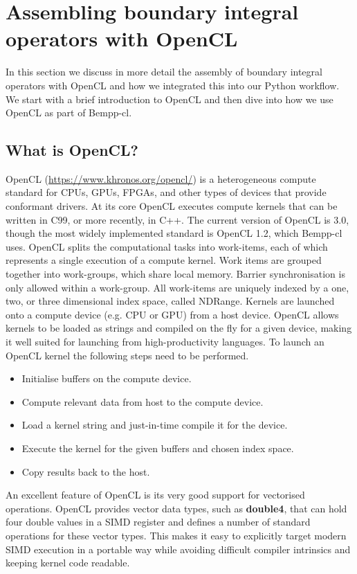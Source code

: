 \section{Assembling boundary integral operators with OpenCL}

In this section we discuss in more detail the assembly of boundary integral operators with OpenCL
and how we integrated this into our Python workflow. We start with a brief introduction to OpenCL and then
dive into how we use OpenCL as part of Bempp-cl.

\subsection{What is OpenCL?}

OpenCL (\url{https://www.khronos.org/opencl/}) is a heterogeneous compute standard for CPUs, GPUs, FPGAs, and other types of devices that provide conformant drivers. At its core OpenCL executes compute kernels that can be written in C99, or more recently, in C++. The current version of OpenCL is 3.0, though the most widely implemented standard is OpenCL 1.2, which Bempp-cl uses. OpenCL splits the computational tasks into work-items, each of which represents a single execution of a compute kernel. Work items are grouped together into work-groups, which share local memory. Barrier synchronisation is only allowed within a work-group. All work-items are uniquely indexed by a one, two, or three dimensional index space, called NDRange. Kernels are launched onto a compute device (e.g. CPU or GPU) from a host device. OpenCL allows kernels to be loaded as strings and compiled on the fly for a given device, making it well suited for launching from high-productivity languages. To launch an OpenCL kernel the following steps need to be performed.
\begin{itemize}
	\item Initialise buffers on the compute device.
	\item Compute relevant data from host to the compute device.
	\item Load a kernel string and just-in-time compile it for the device.
	\item Execute the kernel for the given buffers and chosen index space.
	\item Copy results back to the host.
\end{itemize}
An excellent feature of OpenCL is its very good support for vectorised operations. OpenCL provides vector data types, such as \textbf{double4}, that can hold four double values in a SIMD register and defines a number of standard operations for these vector types. This makes it easy to explicitly target modern SIMD execution in a portable way while avoiding difficult compiler intrinsics and keeping kernel code readable.


